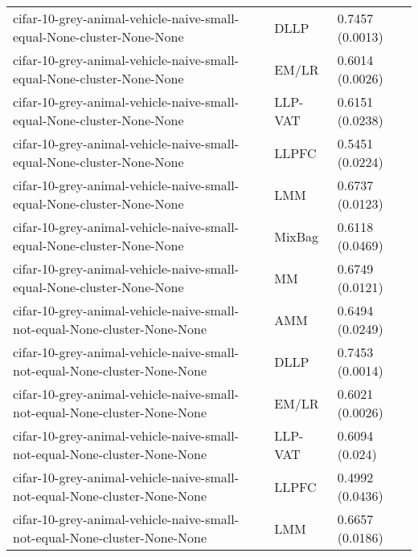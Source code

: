 \begin{longtable}{lll}
                                        cifar-10-grey-animal-vehicle-naive-small-equal-None-cluster-None-None &      DLLP &                           0.7457 (0.0013) \\
                                        cifar-10-grey-animal-vehicle-naive-small-equal-None-cluster-None-None &     EM/LR &                           0.6014 (0.0026) \\
                                        cifar-10-grey-animal-vehicle-naive-small-equal-None-cluster-None-None &   LLP-VAT &                           0.6151 (0.0238) \\
                                        cifar-10-grey-animal-vehicle-naive-small-equal-None-cluster-None-None &     LLPFC &                           0.5451 (0.0224) \\
                                        cifar-10-grey-animal-vehicle-naive-small-equal-None-cluster-None-None &       LMM &                           0.6737 (0.0123) \\
                                        cifar-10-grey-animal-vehicle-naive-small-equal-None-cluster-None-None &    MixBag &                           0.6118 (0.0469) \\
                                        cifar-10-grey-animal-vehicle-naive-small-equal-None-cluster-None-None &        MM &                           0.6749 (0.0121) \\
                                    cifar-10-grey-animal-vehicle-naive-small-not-equal-None-cluster-None-None &       AMM &                           0.6494 (0.0249) \\
                                    cifar-10-grey-animal-vehicle-naive-small-not-equal-None-cluster-None-None &      DLLP &                           0.7453 (0.0014) \\
                                    cifar-10-grey-animal-vehicle-naive-small-not-equal-None-cluster-None-None &     EM/LR &                           0.6021 (0.0026) \\
                                    cifar-10-grey-animal-vehicle-naive-small-not-equal-None-cluster-None-None &   LLP-VAT &                            0.6094 (0.024) \\
                                    cifar-10-grey-animal-vehicle-naive-small-not-equal-None-cluster-None-None &     LLPFC &                           0.4992 (0.0436) \\
                                    cifar-10-grey-animal-vehicle-naive-small-not-equal-None-cluster-None-None &       LMM &                           0.6657 (0.0186) \\

\end{longtable}
